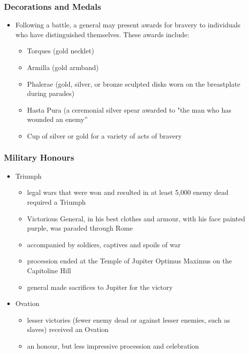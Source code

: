 \documentclass[12pt, twoside]{article}
\begin{document}
\subsubsection{Decorations and Medals}
\begin{itemize}
\item Following a battle, a general may present awards for bravery to individuals who have distinguished themselves. These awards include:
	\begin{itemize}
	\item Torques (gold necklet)
	\item Armilla (gold armband) 
	\item Phalerae (gold, silver, or bronze sculpted disks worn on the breastplate during parades)
	\item Hasta Pura (a ceremonial silver spear awarded to "the man who has wounded an enemy”
	\item Cup of silver or gold for a variety of acts of bravery
	\end{itemize}
\end{itemize}
\subsubsection{Military Honours} 
\begin{itemize}
\item Triumph
	\begin{itemize}
	\item legal wars that were won and resulted in at least 5,000 enemy dead required a Triumph
	\item Victorious General, in his best clothes and armour, with his face painted purple, was paraded through Rome
	\item accompanied by soldiers, captives and spoils of war
	\item procession ended at the Temple of Jupiter Optimus Maximus on the Capitoline Hill
	\item general made sacrifices to Jupiter for the victory
	\end{itemize}
\item Ovation
	\begin{itemize}
	\item lesser victories (fewer enemy dead or against lesser enemies, such as slaves) received an Ovation
	\item an honour, but less impressive procession and celebration
	\end{itemize}
\end{itemize}
\end{document}
